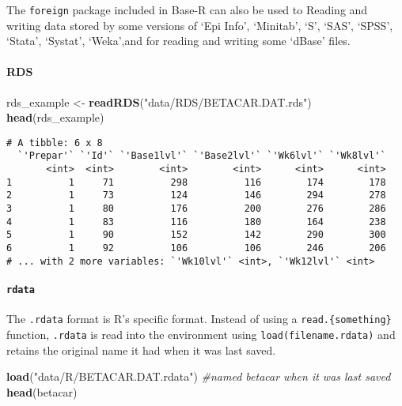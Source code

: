 \documentclass[]{book}
\newenvironment{Shaded}{\begin{snugshade}}{\end{snugshade}}
\newcommand{\KeywordTok}[1]{\textcolor[rgb]{0.13,0.29,0.53}{\textbf{#1}}}
\newcommand{\StringTok}[1]{\textcolor[rgb]{0.31,0.60,0.02}{#1}}
\newcommand{\CommentTok}[1]{\textcolor[rgb]{0.56,0.35,0.01}{\textit{#1}}}
\newcommand{\NormalTok}[1]{#1}
\let\oldparagraph\paragraph
\renewcommand{\paragraph}[1]{\oldparagraph{#1}\mbox{}}
\theoremstyle{definition}
\theoremstyle{definition}
\theoremstyle{definition}
\theoremstyle{remark}
\begin{document}
The \texttt{foreign} package included in Base-R can also be used to
Reading and writing data stored by some versions of `Epi Info',
`Minitab', `S', `SAS', `SPSS', `Stata', `Systat', `Weka',and for reading
and writing some `dBase' files.

\paragraph{RDS}\label{rds}

\begin{Shaded}
\begin{Highlighting}[]
\NormalTok{rds_example <-}\StringTok{ }\KeywordTok{readRDS}\NormalTok{(}\StringTok{"data/RDS/BETACAR.DAT.rds"}\NormalTok{)}
\KeywordTok{head}\NormalTok{(rds_example)}
\end{Highlighting}
\end{Shaded}

\begin{verbatim}
# A tibble: 6 x 8
  `'Prepar'` `'Id'` `'Base1lvl'` `'Base2lvl'` `'Wk6lvl'` `'Wk8lvl'`
       <int>  <int>        <int>        <int>      <int>      <int>
1          1     71          298          116        174        178
2          1     73          124          146        294        278
3          1     80          176          200        276        286
4          1     83          116          180        164        238
5          1     90          152          142        290        300
6          1     92          106          106        246        206
# ... with 2 more variables: `'Wk10lvl'` <int>, `'Wk12lvl'` <int>
\end{verbatim}

\paragraph{\texorpdfstring{\texttt{rdata}}{rdata}}\label{rdata}

The \texttt{.rdata} format is R's specific format. Instead of using a
\texttt{read.\{something\}} function, \texttt{.rdata} is read into the
environment using \texttt{load(filename.rdata)} and retains the original
name it had when it was last saved.

\begin{Shaded}
\begin{Highlighting}[]
\KeywordTok{load}\NormalTok{(}\StringTok{"data/R/BETACAR.DAT.rdata"}\NormalTok{)  }\CommentTok{#named betacar when it was last saved}
\KeywordTok{head}\NormalTok{(betacar)}
\end{Highlighting}
\end{Shaded}
\end{document}
